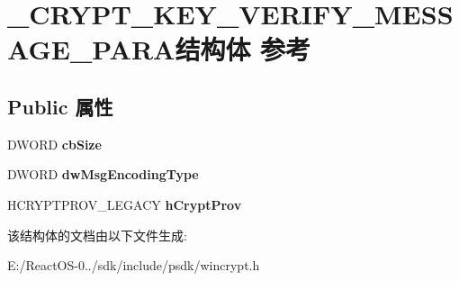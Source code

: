 \hypertarget{struct___c_r_y_p_t___k_e_y___v_e_r_i_f_y___m_e_s_s_a_g_e___p_a_r_a}{}\section{\+\_\+\+C\+R\+Y\+P\+T\+\_\+\+K\+E\+Y\+\_\+\+V\+E\+R\+I\+F\+Y\+\_\+\+M\+E\+S\+S\+A\+G\+E\+\_\+\+P\+A\+R\+A结构体 参考}
\label{struct___c_r_y_p_t___k_e_y___v_e_r_i_f_y___m_e_s_s_a_g_e___p_a_r_a}
\subsection*{Public 属性}
\begin{DoxyCompactItemize}
\item 
\mbox{\label{struct___c_r_y_p_t___k_e_y___v_e_r_i_f_y___m_e_s_s_a_g_e___p_a_r_a_a44816bcced4860a64cb53e19d02eddec}} 
D\+W\+O\+RD {\bfseries cb\+Size}
\item 
\mbox{\label{struct___c_r_y_p_t___k_e_y___v_e_r_i_f_y___m_e_s_s_a_g_e___p_a_r_a_a204143d89ce11bd0c08b0cebacbf8a4f}} 
D\+W\+O\+RD {\bfseries dw\+Msg\+Encoding\+Type}
\item 
\mbox{\label{struct___c_r_y_p_t___k_e_y___v_e_r_i_f_y___m_e_s_s_a_g_e___p_a_r_a_a68e40ba0d2f344d6bd5e030f44760cb4}} 
H\+C\+R\+Y\+P\+T\+P\+R\+O\+V\+\_\+\+L\+E\+G\+A\+CY {\bfseries h\+Crypt\+Prov}
\end{DoxyCompactItemize}


该结构体的文档由以下文件生成\+:\begin{DoxyCompactItemize}
\item 
E\+:/\+React\+O\+S-\/0../sdk/include/psdk/wincrypt.\+h\end{DoxyCompactItemize}
